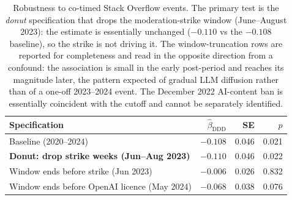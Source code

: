 \begin{table}[ht]
\centering
\caption{Robustness to co-timed Stack Overflow events. The primary test
is the \emph{donut} specification that drops the moderation-strike window
(June--August 2023): the estimate is essentially unchanged ($-0.110$ vs
the $-0.108$ baseline), so the strike is not driving it. The
window-truncation rows are reported for completeness and read in the
opposite direction from a confound: the association is small in the early
post-period and reaches its magnitude later, the pattern expected of
gradual LLM diffusion rather than of a one-off 2023--2024 event. The
December 2022 AI-content ban is essentially coincident with the cutoff
and cannot be separately identified.}
\label{tab:late_confounders}
\small
\begin{tabular}{lrrr}
\toprule
Specification & $\hat\beta_{\text{DDD}}$ & SE & $p$ \\
\midrule
Baseline (2020--2024) & $-0.108$ & 0.046 & 0.021 \\
\textbf{Donut: drop strike weeks (Jun--Aug 2023)} & $\mathbf{-0.110}$ & 0.046 & 0.022 \\
\midrule
Window ends before strike (Jun 2023) & $-0.006$ & 0.026 & 0.832 \\
Window ends before OpenAI licence (May 2024) & $-0.068$ & 0.038 & 0.076 \\
\bottomrule
\end{tabular}
\end{table}
